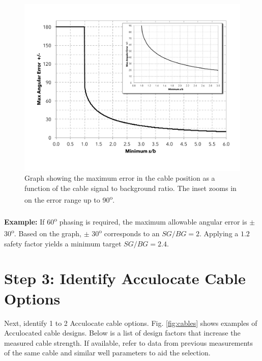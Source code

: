 \documentclass[paper=a4, fontsize=11pt]{scrartcl}
\numberwithin{equation}{section}		%
\numberwithin{figure}{section}			%
\numberwithin{table}{section}				%
\begin{document}
\begin{figure}[h!]
    \caption{Graph showing the maximum error in the cable position as a function of the cable signal to background ratio.  The inset zooms in on the error range up to 90\textsuperscript{o}.}
    \label{fig:max_error_graph}
    \centering
    \includegraphics[width=1.0\textwidth]{figures/max_error_vs_sgbg.pdf}
\end{figure}

\paragraph{}
\textbf{Example:} If 60\textsuperscript{o} phasing is required, the maximum allowable angular error is $\pm$ 30\textsuperscript{o}.  Based on the graph, $\pm$ 30\textsuperscript{o} corresponds to an $SG/BG=2$.  Applying a $1.2$ safety factor yields a minimum target $SG/BG = 2.4$.

\section{Step 3: Identify Acculocate Cable Options}
Next, identify 1 to 2 Acculocate cable options.  Fig. \ref{fig:cables} shows examples of Acculocated cable designs.  Below is a list of design factors that increase the measured cable strength.  If available, refer to data from previous measurements of the same cable and similar well parameters to aid the selection. 
\end{document}
